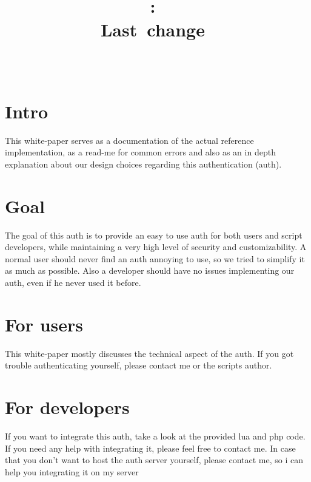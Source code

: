 \documentclass{article}
\title{
\vspace{2in}
\textmd{\textbf{\hmwkClass:\ \hmwkTitle}}\\
\normalsize\vspace{0.1in}\small{Last\ change\ \hmwkDueDate}\\
\vspace{0.1in}\large{\textit{\hmwkClassInstructor\ \hmwkClassTime}}
\vspace{3in}
}
\author{\textbf{\hmwkAuthorName}}
\date{} %
\begin{document}
\maketitle



\newpage
\tableofcontents
\newpage



\section{Intro}
	This white-paper serves as a documentation of the actual reference implementation, as a read-me for common errors and also
	as an in depth explanation about our design choices regarding this authentication (auth).

\section{Goal}
	The goal of this auth is to provide an easy to use auth for both users and script developers, while maintaining a very
	high level of security and customizability.
	A normal user should never find an auth annoying to use, so we tried to simplify it as much as possible.
	Also a developer should have no issues implementing our auth, even if he never used it before.

\section{For users}
	This white-paper mostly discusses the technical aspect of the auth.
	If you got trouble authenticating yourself, please contact me or the scripts author.

\section{For developers}
	If you want to integrate this auth, take a look at the provided lua and php code.
	If you need any help with integrating it, please feel free to contact me.
	In case that you don't want to host the auth server yourself, please contact me, so i can help you integrating it on my server 
\end{document}

